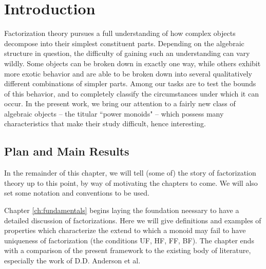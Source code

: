 \chapter{Introduction} \label{ch:intro}

Factorization theory pursues a full understanding of how complex objects decompose into their simplest constituent parts.  
Depending on the algebraic structure in question, the difficulty of gaining such an understanding can vary wildly. 
Some objects can be broken down in exactly one way, while others exhibit more exotic behavior and are able to be broken down into several qualitatively different combinations of simpler parts.
Among our tasks are to test the bounds of this behavior, and to completely classify the circumstances under which it can occur.
In the present work, we bring our attention to a fairly new class of algebraic objects -- the titular ``power monoids" --  which possess many characteristics that make their study difficult, hence interesting.

\section{Plan and Main Results}
In the remainder of this chapter, we will tell (some of) the story of factorization theory up to this point, by way of motivating the chapters to come.  
We will also set some notation and conventions to be used.


Chapter \ref{ch:fundamentals} begins laying the foundation neessary to have a detailed discussion of factorizations.
Here we will give definitions and examples of properties which characterize the extend to which a monoid may fail to have uniqueness of factorization (the conditions UF, HF, FF, BF).  
The chapter ends with a comparison of the present framework to the existing body of literature, especially the work of D.D. Anderson et al.

